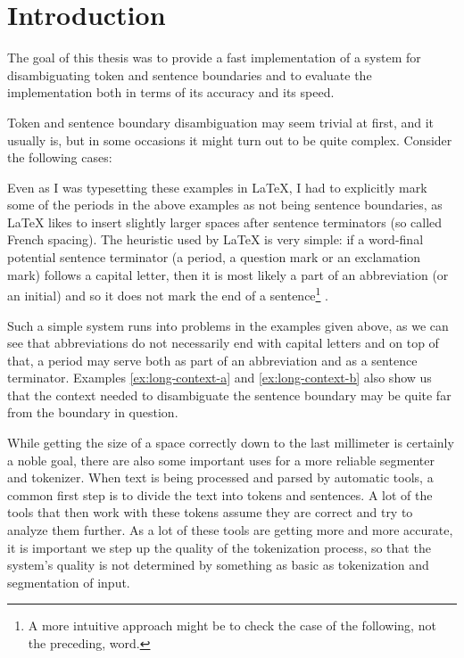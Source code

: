 \section{Introduction}

The goal of this thesis was to provide a fast implementation of a system for
disambiguating token and sentence boundaries and to evaluate the
implementation both in terms of its accuracy and its speed.

Token and sentence boundary disambiguation may seem trivial at first, and it
usually is, but in some occasions it might turn out to be quite complex.
Consider the following cases:

\begin{exe}
\end{exe}

Even as I was typesetting these examples in \LaTeX{}, I had to explicitly mark
some of the periods in the above examples as not being sentence boundaries, as
\LaTeX{} likes to insert slightly larger spaces after sentence terminators (so
called French spacing). The heuristic used by \LaTeX{} is very simple: if a
word-final potential sentence terminator (a period, a question mark or an
exclamation mark) follows a capital letter, then it is most likely a part of
an abbreviation (or an initial) and so it does not mark the end of a
sentence\footnote{A more intuitive approach might be to check the case of the
following, not the preceding, word.} \cite{web-latex}.

Such a simple system runs into problems in the examples given above, as we
can see that abbreviations do not necessarily end with capital letters and on
top of that, a period may serve both as part of an abbreviation and as a
sentence terminator. Examples \ref{ex:long-context-a} and
\ref{ex:long-context-b} also show us that the context needed to disambiguate
the sentence boundary may be quite far from the boundary in question.

While getting the size of a space correctly down to the last millimeter is
certainly a noble goal, there are also some important uses for a more reliable
segmenter and tokenizer. When text is being processed and parsed by automatic
tools, a common first step is to divide the text into tokens and sentences. A
lot of the tools that then work with these tokens assume they are correct and
try to analyze them further. As a lot of these tools are getting more and more
accurate, it is important we step up the quality of the tokenization process,
so that the system's quality is not determined by something as basic as
tokenization and segmentation of input. 

